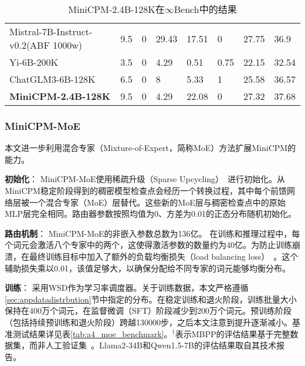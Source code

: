 \begin{table}[htpb]
{\begin{tabular}{m{4cm}m{1.4cm}m{1.0cm}m{1.0cm}m{1.2cm}m{1.2cm}m{1.2cm}m{1.2cm}}
    Mistral-7B-Instruct-v0.2(ABF 1000w) & 9.5                   & 0          & 29.43      & 17.51       & 0         & 27.75 & 36.9               \\
    Yi-6B-200K                          & 3.5                   & 0          & 4.29       & 0.51        & 0.75      & 22.15 & 32.54              \\
    ChatGLM3-6B-128K                    & 6.5                   & 0          & 8          & 5.33        & 1         & 25.58 & 36.57              \\
    \midrule
    \textbf{MiniCPM-2.4B-128K}                   & 9.5                   & 0          & 4.29       & 22.08       & 0         & 27.32 & 37.68              \\
    \bottomrule
    \end{tabular}
    }
    \caption{MiniCPM-2.4B-128K在$\infty$Bench中的结果}
    \label{tab:longcontext}
    \end{table}

\subsubsection{MiniCPM-MoE}
本文进一步利用混合专家（Mixture-of-Expert，简称MoE）方法扩展MiniCPM的能力。

\textbf{初始化}：
MiniCPM-MoE使用稀疏升级（Sparse Upcycling）~\citep{komatsuzaki2022sparse}进行初始化。从MiniCPM稳定阶段得到的稠密模型检查点会经历一个转换过程，其中每个前馈网络层被一个混合专家（MoE）层替代。这些新的MoE层与稠密检查点中的原始MLP层完全相同。路由器参数按照均值为0、方差为0.01的正态分布随机初始化。

\textbf{路由机制}：
MiniCPM-MoE的非嵌入参数总数为136亿。
在训练和推理过程中，每个词元会激活八个专家中的两个，这使得激活参数的数量约为40亿。为防止训练崩溃，在最终训练目标中加入了额外的负载均衡损失（load balancing loss）~\citep{fedus2022switch}。这个辅助损失乘以0.01，该值足够大，以确保分配给不同专家的词元能够均衡分布。

\textbf{训练}：
采用WSD作为学习率调度器。关于训练数据，本文严格遵循\ref{sec:appdatadistrbution}节中指定的分布。在稳定训练和退火阶段，训练批量大小保持在400万个词元，在监督微调（SFT）阶段减少到200万个词元。预训练阶段（包括持续预训练和退火阶段）跨越130000步，之后本文注意到提升逐渐减小。基准测试结果详见表\ref{tab:a4_moe_benchmark}。$^\dag$表示MBPP的评估结果基于完整数据集，而非人工验证集~\citep{austin2021program}。Llama2-34B和Qwen1.5-7B的评估结果取自其技术报告。

